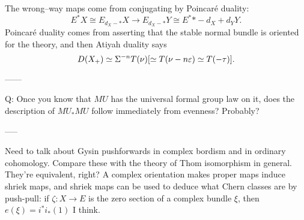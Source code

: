 The wrong--way maps come from conjugating by Poincar\'e duality: \[E^* X \cong E_{d_X-*} X \to E_{d_X-*} Y \cong E^*{*-d_X+d_Y} Y.\]  Poincar\'e duality comes from asserting that the stable normal bundle is oriented for the theory, and then Atiyah duality says \[D(X_+) \simeq \Sigma^{-n} T(\nu) [\simeq T(\nu - n\varepsilon) \simeq T(-\tau)]. \]

------

Q: Once you know that $MU$ has the universal formal group law on it, does the description of $MU_* MU$ follow immediately from evenness?  Probably?

-----

Need to talk about Gysin pushforwards in complex bordism and in ordinary cohomology.  Compare these with the theory of Thom isomorphism in general.  They're equivalent, right?  A complex orientation makes proper maps induce shriek maps, and shriek maps can be used to deduce what Chern classes are by push-pull: if $\zeta: X \to E$ is the zero section of a complex bundle $\xi$, then $e(\xi) = i^* i_*(1)$ I think.


